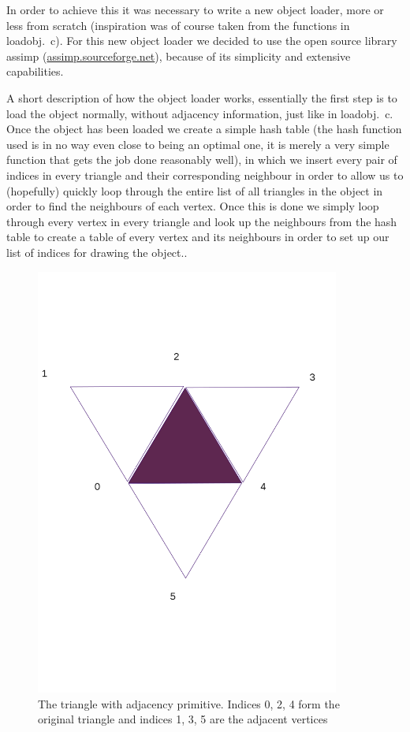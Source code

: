 \documentclass[a4paper, 12pt]{article}
\begin{document}
In order to achieve this it was necessary to write a new object loader, more or
less from scratch (inspiration was of course taken from the functions in
loadobj.~c). For this new object loader we decided to use the open source library
assimp (\url{assimp.sourceforge.net}), because of its simplicity and extensive
capabilities.

A short description of how the object loader works, essentially the first step
is to load the object normally, without adjacency information, just like in
loadobj.~c. Once the object has been loaded we create a simple hash table (the
hash function used is in no way even close to being an optimal one, it is merely
a very simple function that gets the job done reasonably well), in which we
insert every pair of indices in every triangle and their corresponding neighbour
in order to allow us to (hopefully) quickly loop through the entire list of all
triangles in the object in order to find the neighbours of each vertex. Once
this is done we simply loop through every vertex in every triangle and look up
the neighbours from the hash table to create a table of every vertex and its
neighbours in order to set up our list of indices for drawing the object..

\begin{figure}[h]
\centering
\includegraphics[width=10cm, trim = 0mm 50mm 0mm 50mm, clip]{triangle_adj.png}
\caption{The triangle with adjacency primitive. Indices 0, 2, 4 form the
original triangle and indices 1, 3, 5 are the adjacent vertices}
\end{figure}
\end{document}
